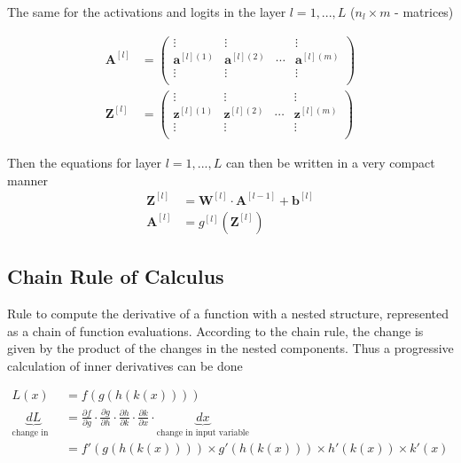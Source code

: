 \documentclass[11pt]{article}
\begin{document}
\noindent
The same for the activations and logits in the layer $l=1,...,L$ ($n_l\times m$ - matrices)

\begin{align*}
	\textbf{A}^{[l]} &= \begin{pmatrix}
		\vdots & \vdots & & \vdots\\
		\textbf{a}^{[l](1)} & \textbf{a}^{[l](2)} & \cdots & \textbf{a}^{[l](m)}\\
		\vdots & \vdots & & \vdots\\
	\end{pmatrix}\\
	\textbf{Z}^{[l]} &= \begin{pmatrix}
	\vdots & \vdots & & \vdots\\
	\textbf{z}^{[l](1)} & \textbf{z}^{[l](2)} & \cdots & \textbf{z}^{[l](m)}\\
	\vdots & \vdots & & \vdots\\
	\end{pmatrix}	
\end{align*}

\noindent
Then the equations for layer $l=1,...,L$ can then be written in a very compact manner
\begin{align*}
	\textbf{Z}^{[l]} &= \textbf{W}^{[l]}\cdot\textbf{A}^{[l-1]} + \textbf{b}^{[l]}\\
	\textbf{A}^{[l]} &= g^{[l]} (\textbf{Z}^{[l]})
\end{align*}

\subsection{Chain Rule of Calculus}
Rule to compute the derivative of a function with a nested structure, represented as a chain of function evaluations. According to the chain rule, the change is given by the product of the changes in the nested components. Thus a progressive calculation of inner derivatives can be done

\begin{align*}
	L(x) &= f(g(h(k(x))))\\
	\underbrace{dL}_{\text{change in target}} &= \frac{\partial f}{\partial g}\cdot\frac{\partial g}{\partial h}\cdot\frac{\partial h}{\partial k}\cdot\frac{\partial k}{\partial x}\cdot \underbrace{dx}_{\text{change in input variable}}\\
	&=f'(g(h(k(x)))) \times g'(h(k(x))) \times h'(k(x)) \times k'(x)
\end{align*}
\end{document}
